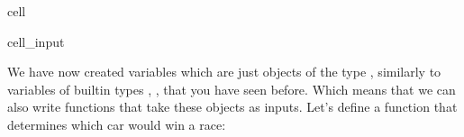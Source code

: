 \documentclass[letterpaper,10pt,english]{jupyterBook}
\begin{document}
\begin{sphinxuseclass}{cell}\begin{sphinxVerbatimInput}

\begin{sphinxuseclass}{cell_input}
\begin{sphinxVerbatim}[commandchars=\\\{\}]
    
\end{sphinxVerbatim}

\end{sphinxuseclass}\end{sphinxVerbatimInput}

\end{sphinxuseclass}
\sphinxAtStartPar
We have now created variables which are just objects of the type , similarly to variables of built\sphinxhyphen{}in types , ,  that you have seen before. Which means that we can also write functions that take these objects as inputs. Let’s define a function that determines which car would win a race:
\end{document}
